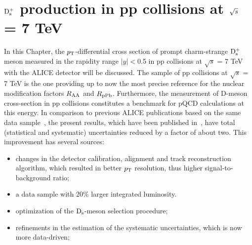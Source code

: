 \chapter{${\rm D_s^+}$ production in pp collisions at $\sqrt{s}$ = 7 TeV}
\label{chap:pp}
In this Chapter, the $p_{\rm T}$-differential cross section of prompt charm-strange ${\rm D_s^+}$ meson 
measured in the rapidity range $|y| < $0.5 in pp collisions at 
$\sqrt{s}$ = 7 TeV with the ALICE detector will be discussed.
The sample of pp collisions at $\sqrt{s}$ = 7 TeV is the one providing up to now the most precise reference for
the nuclear modification factors $R_{\rm AA}$ and $R_{\rm pPb}$. 
Furthermore, the measurement of D-meson cross-section in pp collisions 
constitutes a benchmark for pQCD calculations
at this energy.
In comparison to previous ALICE publications based on the same data 
sample~\cite{ALICE:2011aa,Abelev:2012tca,Adam:2016ich}, the present 
results, which have been published in~\cite{Acharya:2017jgo}, have total (statistical and systematic) 
uncertainties reduced by a factor of about two. This improvement has several sources: 
\begin{itemize}
\item changes in the detector calibration, alignment and track reconstruction 
algorithm, which resulted in better $p_{\rm T}$ resolution, thus higher signal-to-background ratio; 
\item a data sample with 20\% larger integrated luminosity.
\item optimization of the ${\rm D_s}$-meson selection procedure; 
\item refinements in the estimation of the systematic uncertainties, which is now more data-driven;
\end{itemize} 

